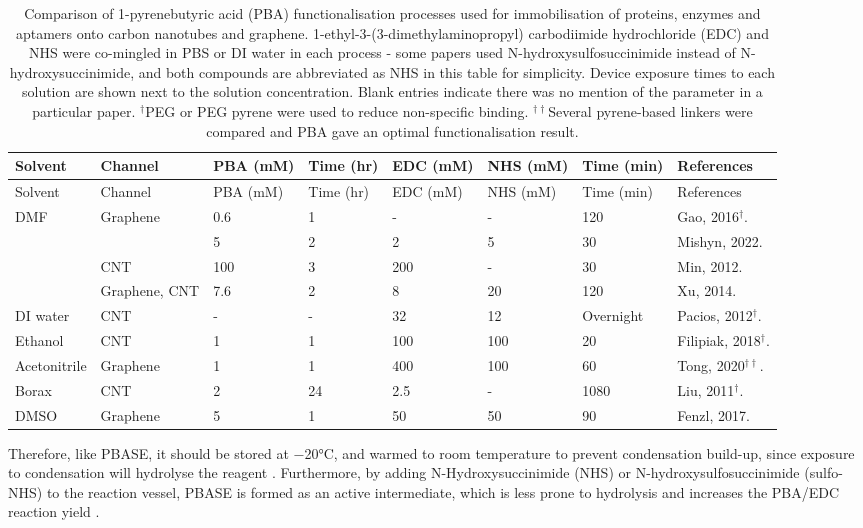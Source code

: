 \documentclass[
  a4paper,
]{scrbook}
\begin{document}
\hypertarget{tbl-pba-functionalisation}{}
\begin{longtable}[]{@{}llllllll@{}}
\caption{\label{tbl-pba-functionalisation}Comparison of 1-pyrenebutyric
acid (PBA) functionalisation processes used for immobilisation of
proteins, enzymes and aptamers onto carbon nanotubes and graphene.
1-ethyl-3-(3-dimethylaminopropyl) carbodiimide hydrochloride (EDC) and
NHS were co-mingled in PBS or DI water in each process - some papers
used N-hydroxysulfosuccinimide instead of N-hydroxysuccinimide, and both
compounds are abbreviated as NHS in this table for simplicity. Device
exposure times to each solution are shown next to the solution
concentration. Blank entries indicate there was no mention of the
parameter in a particular paper. \(^†\)PEG or PEG pyrene were used to
reduce non-specific binding. \(^{††}\)Several pyrene-based linkers were
compared and PBA gave an optimal functionalisation
result.}\tabularnewline
\toprule\noalign{}
Solvent & Channel & PBA (mM) & Time (hr) & EDC (mM) & NHS (mM) & Time
(min) & References \\
\midrule\noalign{}
\endfirsthead
\toprule\noalign{}
Solvent & Channel & PBA (mM) & Time (hr) & EDC (mM) & NHS (mM) & Time
(min) & References \\
\midrule\noalign{}
\endhead
\bottomrule\noalign{}
\endlastfoot
DMF & Graphene & 0.6 & 1 & - & - & 120 & Gao, 2016\(^†\).
\cite{Gao2016} \\
& & 5 & 2 & 2 & 5 & 30 & Mishyn, 2022. \cite{Mishyn2022} \\
& CNT & 100 & 3 & 200 & - & 30 & Min, 2012. \cite{Min2012} \\
& Graphene, CNT & 7.6 & 2 & 8 & 20 & 120 & Xu, 2014. \cite{Xu2014} \\
DI water & CNT & - & - & 32 & 12 & Overnight & Pacios, 2012\(^†\).
\cite{Pacios2012} \\
Ethanol & CNT & 1 & 1 & 100 & 100 & 20 & Filipiak, 2018\(^†\).
\cite{Filipiak2018} \\
Acetonitrile & Graphene & 1 & 1 & 400 & 100 & 60 & Tong, 2020\(^{††}\).
\cite{Tong2020} \\
Borax & CNT & 2 & 24 & 2.5 & - & 1080 & Liu, 2011\(^†\).
\cite{Liu2011} \\
DMSO & Graphene & 5 & 1 & 50 & 50 & 90 & Fenzl, 2017.
\cite{Fenzl2017} \\
\end{longtable}

\newpage
{}

Therefore, like PBASE, it should be stored at −20°C, and warmed to room
temperature to prevent condensation build-up, since exposure to
condensation will hydrolyse the reagent \autocite{Hermanson2013-4}.
Furthermore, by adding N-Hydroxysuccinimide (NHS) or
N-hydroxysulfosuccinimide (sulfo-NHS) to the reaction vessel, PBASE is
formed as an active intermediate, which is less prone to hydrolysis and
increases the PBA/EDC reaction yield
\autocite{Sehgal1994,Hermanson2013-4,Hermanson2013-14}.
\end{document}
